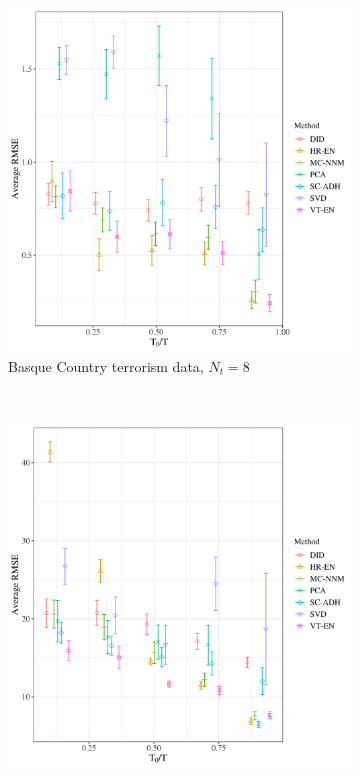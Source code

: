 \documentclass[12pt]{article}
\begin{document}
\begin{figure}[htbp]
	\centering
	\begin{subfigure}[t]{0.45\textwidth}
		\centering
		\includegraphics[width=\textwidth]{plots/basque_N_16_T_43_numruns_20_num_treated_8_simultaneuous_1.png}
		\caption{Basque Country terrorism data, $N_t = 8$} 
	\end{subfigure}
	~ 
	\begin{subfigure}[t]{0.45\textwidth}
		\centering
		\includegraphics[width=\textwidth]{plots/california_N_38_T_31_numruns_20_num_treated_19_simultaneuous_1.png}

\end{subfigure}
\end{figure}
\end{document}

